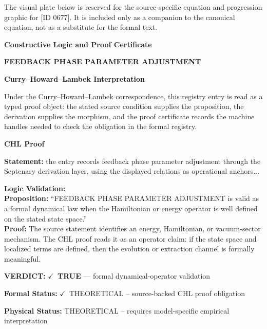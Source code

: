 \begingroup\footnotesize\sloppy
The visual plate below is reserved for the source-specific equation and progression graphic for [ID 0677]. It is included only as a companion to the canonical equation, not as a substitute for the formal text.
\par\endgroup
\ifTZPDarkEdition
{}
\fi

\clearpage
\begingroup\tzpsupportsetup
\noindent\textbf{\fontsize{10.8pt}{12.8pt}\selectfont [ID 0677] Constructive Logic and Proof Certificate}\par
\noindent\textbf{\fontsize{10pt}{12pt}\selectfont FEEDBACK PHASE PARAMETER ADJUSTMENT}\par
\vspace{0.45em}
\begingroup
\footnotesize
\setlength{\parskip}{0.22em}
\setlength{\parindent}{0pt}
\noindent\textbf{Curry--Howard--Lambek Interpretation}\par
Under the Curry--Howard--Lambek correspondence, this registry entry is read as a typed proof
object: the stated source condition supplies the proposition, the derivation supplies the
morphism, and the proof certificate records the machine handles needed to check the obligation
in the formal registry.

\vspace{0.45em}
\noindent\textbf{CHL Proof}\par
\textbf{Statement:} the entry records feedback phase parameter adjustment through the Septenary derivation
layer, using the displayed relations as operational anchors...

\textbf{Logic Validation:}\\
\textbf{Proposition:} ``FEEDBACK PHASE PARAMETER ADJUSTMENT is valid as a formal dynamical law when the
Hamiltonian or energy operator is well defined on the stated state space.''\\
\textbf{Proof:} The source statement identifies an energy, Hamiltonian, or vacuum-sector mechanism. The
CHL proof reads it as an operator claim: if the state space and localized terms are
defined, then the evolution or extraction channel is formally meaningful.

\textbf{VERDICT:} \ensuremath{\checkmark}\ \textbf{TRUE} --- formal dynamical-operator validation

\textbf{Formal Status:} \ensuremath{\checkmark}\ THEORETICAL -- source-backed CHL proof obligation

\textbf{Physical Status:} THEORETICAL -- requires model-specific empirical interpretation
\par\vspace{0.45em}
\par
\ifTZPDarkEdition
{}
\fi
\endgroup
\endgroup
